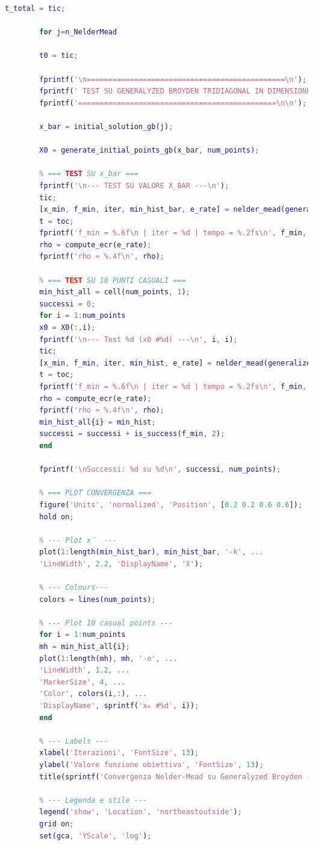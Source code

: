 \documentclass[a4paper,12pt]{article}
\begin{document}
\begin{lstlisting}[language=Matlab,caption={Full script: Nelder Mead Method on all function},label={lst:rosenbrock-extended}]
		t_total = tic;
		
		for j=n_NelderMead
		
		t0 = tic;
		
		fprintf('\n==============================================\n');
		fprintf(' TEST SU GENERALYZED BROYDEN TRIDIAGONAL IN DIMENSIONE %d \n', j);
		fprintf('==============================================\n\n');
		
		x_bar = initial_solution_gb(j);
		
		X0 = generate_initial_points_gb(x_bar, num_points);
		
		% === TEST SU x_bar ===
		fprintf('\n--- TEST SU VALORE X_BAR ---\n');
		tic;
		[x_min, f_min, iter, min_hist_bar, e_rate] = nelder_mead(generalized_broyden, x_bar, tol, max_iter);
		t = toc;
		fprintf('f_min = %.6f\n | iter = %d | tempo = %.2fs\n', f_min, iter, t);
		rho = compute_ecr(e_rate);
		fprintf('rho ≈ %.4f\n', rho);
		
		% === TEST SU 10 PUNTI CASUALI ===
		min_hist_all = cell(num_points, 1);
		successi = 0;
		for i = 1:num_points
		x0 = X0(:,i);
		fprintf('\n--- Test %d (x0 #%d) ---\n', i, i);
		tic;
		[x_min, f_min, iter, min_hist, e_rate] = nelder_mead(generalized_broyden, x0, tol, max_iter);
		t = toc;
		fprintf('f_min = %.6f\n | iter = %d | tempo = %.2fs\n', f_min, iter, t);
		rho = compute_ecr(e_rate);
		fprintf('rho ≈ %.4f\n', rho);
		min_hist_all{i} = min_hist;
		successi = successi + is_success(f_min, 2);
		end
		
		fprintf('\nSuccessi: %d su %d\n', successi, num_points);
		
		% === PLOT CONVERGENZA ===
		figure('Units', 'normalized', 'Position', [0.2 0.2 0.6 0.6]);  % finestra ampia
		hold on;
		
		% --- Plot x̄  ---
		plot(1:length(min_hist_bar), min_hist_bar, '-k', ...
		'LineWidth', 2.2, 'DisplayName', 'x̄');
		
		% --- Colours---
		colors = lines(num_points);
		
		% --- Plot 10 casual points ---
		for i = 1:num_points
		mh = min_hist_all{i};
		plot(1:length(mh), mh, '-o', ...
		'LineWidth', 1.2, ...
		'MarkerSize', 4, ...
		'Color', colors(i,:), ...
		'DisplayName', sprintf('x₀ #%d', i));
		end
		
		% --- Labels ---
		xlabel('Iterazioni', 'FontSize', 13);
		ylabel('Valore funzione obiettivo', 'FontSize', 13);
		title(sprintf('Convergenza Nelder-Mead su Generalyzed Broyden (n = %d)', j), 'FontSize', 14);
		
		% --- Legenda e stile ---
		legend('show', 'Location', 'northeastoutside');
		grid on;
		set(gca, 'YScale', 'log');  
		

\end{lstlisting}
\end{document}
